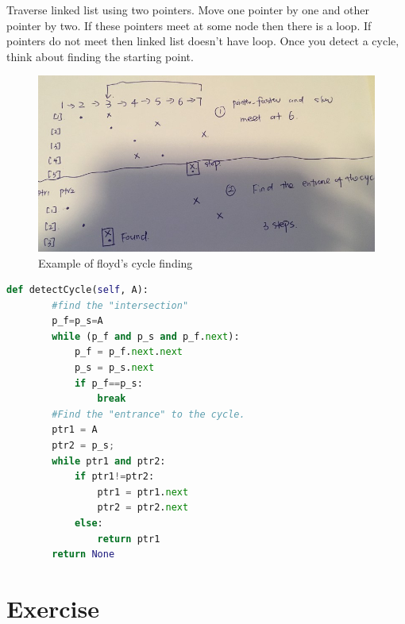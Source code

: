 \documentclass[../main.tex]{subfiles}
\begin{document}
Traverse linked list using two pointers. Move one pointer by one and other pointer by two. If these pointers meet at some node then there is a loop. If pointers do not meet then linked list doesn’t have loop. Once you detect a cycle, think about finding the starting point.
\begin{figure}[h!]
    \centering
    \includegraphics[width = 0.98\columnwidth]{fig/floyd.png}
    \caption{Example of floyd’s cycle finding}
    \label{fig:floyd}
\end{figure}

\begin{lstlisting}[language = Python]
def detectCycle(self, A):
        #find the "intersection" 
        p_f=p_s=A
        while (p_f and p_s and p_f.next):
            p_f = p_f.next.next
            p_s = p_s.next
            if p_f==p_s:
                break
        #Find the "entrance" to the cycle.
        ptr1 = A
        ptr2 = p_s;
        while ptr1 and ptr2:
            if ptr1!=ptr2:
                ptr1 = ptr1.next
                ptr2 = ptr2.next
            else:
                return ptr1
        return None
\end{lstlisting}
\section{Exercise}
\end{document}
